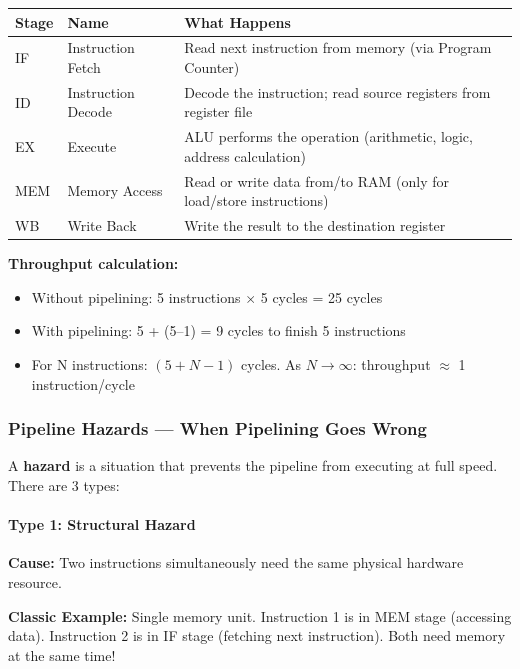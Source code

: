 \documentclass[11pt,a4paper]{article}
\newcommand{\term}[1]{\textbf{\color{darkblue}#1}}
\begin{document}
\begin{center}
\begin{tabular}{C{1.5cm} L{3cm} L{8cm}}
\toprule
\textbf{Stage} & \textbf{Name} & \textbf{What Happens} \\
\midrule
IF  & Instruction Fetch   & Read next instruction from memory (via Program Counter) \\
ID  & Instruction Decode  & Decode the instruction; read source registers from register file \\
EX  & Execute             & ALU performs the operation (arithmetic, logic, address calculation) \\
MEM & Memory Access       & Read or write data from/to RAM (only for load/store instructions) \\
WB  & Write Back          & Write the result to the destination register \\
\bottomrule
\end{tabular}
\end{center}

\textbf{Throughput calculation:}
\begin{itemize}[noitemsep]
  \item Without pipelining: 5 instructions $\times$ 5 cycles = 25 cycles
  \item With pipelining: 5 + (5--1) = 9 cycles to finish 5 instructions
  \item For N instructions: $(5 + N - 1)$ cycles. As $N \to \infty$: throughput $\approx$ 1 instruction/cycle
\end{itemize}

\subsubsection{Pipeline Hazards --- When Pipelining Goes Wrong}

A \term{hazard} is a situation that prevents the pipeline from executing at full speed. There are 3 types:

\paragraph{Type 1: Structural Hazard}

\textbf{Cause:} Two instructions simultaneously need the same physical hardware resource.

\textbf{Classic Example:} Single memory unit. Instruction 1 is in MEM stage (accessing data). Instruction 2 is in IF stage (fetching next instruction). Both need memory at the same time!
\end{document}
